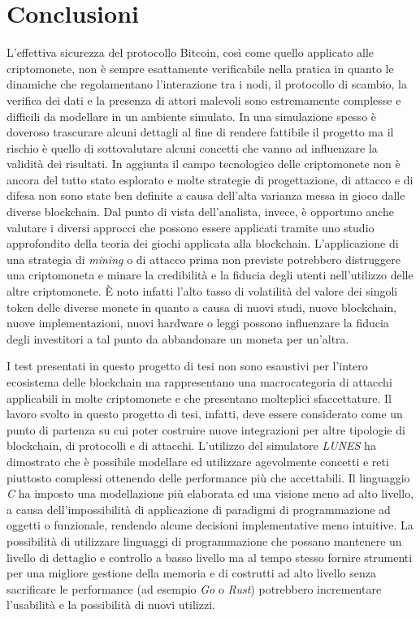 \chapter*{Conclusioni}
L'effettiva sicurezza del protocollo Bitcoin, così come quello applicato alle criptomonete, non è sempre esattamente verificabile nella pratica in quanto le dinamiche che regolamentano l'interazione tra i nodi, il protocollo di scambio, la verifica dei dati e la presenza di attori malevoli sono estremamente complesse e difficili da modellare in un ambiente simulato. In una simulazione spesso è doveroso trascurare alcuni dettagli al fine di rendere fattibile il progetto ma il rischio è quello di sottovalutare alcuni concetti che vanno ad influenzare la validità dei risultati. In aggiunta il campo tecnologico delle criptomonete non è ancora del tutto stato esplorato e molte strategie di progettazione, di attacco e di difesa non sono state ben definite a causa dell'alta varianza messa in gioco dalle diverse blockchain. Dal punto di vista dell'analista, invece, è opportuno anche valutare i diversi approcci che possono essere applicati tramite uno studio approfondito della teoria dei giochi applicata alla blockchain. L'applicazione di una strategia di \textit{mining} o di attacco prima non previste potrebbero distruggere una criptomoneta e minare la credibilità e la fiducia degli utenti nell'utilizzo delle altre criptomonete. È noto infatti l'alto tasso di volatilità del valore dei singoli token delle diverse monete in quanto a causa di nuovi studi, nuove blockchain, nuove implementazioni, nuovi hardware o leggi possono influenzare la fiducia degli investitori a tal punto da abbandonare un moneta per un'altra.\newline\newline

I test presentati in questo progetto di tesi non sono esaustivi per l'intero ecosistema delle blockchain ma rappresentano una macrocategoria di attacchi applicabili in molte criptomonete e che presentano molteplici sfaccettature. Il lavoro svolto in questo progetto di tesi, infatti, deve essere considerato come un punto di partenza su cui poter costruire nuove integrazioni per altre tipologie di blockchain, di protocolli e di attacchi.\newline
L'utilizzo del simulatore \textit{LUNES} ha dimostrato che è possibile modellare ed utilizzare agevolmente concetti e reti piuttosto complessi ottenendo delle performance più che accettabili.
Il linguaggio \textit{C} ha imposto una modellazione più elaborata ed una visione meno ad alto livello, a causa dell'impossibilità di applicazione di paradigmi di programmazione ad oggetti o funzionale, rendendo alcune decisioni implementative meno intuitive. La possibilità di utilizzare linguaggi di programmazione che possano mantenere un livello di dettaglio e controllo a basso livello ma al tempo stesso fornire strumenti per una migliore gestione della memoria e di costrutti ad alto livello senza sacrificare le performance (ad esempio \textit{Go} o \textit{Rust}) potrebbero incrementare l'usabilità e la possibilità di nuovi utilizzi.\newline

